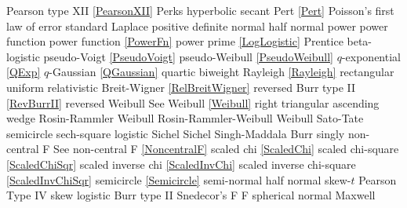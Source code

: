 Pearson type XII 				\dotfill	\eqref{PearsonXII}					\ncite	%
Perks						\dotfill	hyperbolic secant 					\ncite	%
Pert							\dotfill	\eqref{Pert} 						\ncite	%
Poisson's first law of error			\dotfill	standard Laplace					\ncite	%
positive definite normal 			\dotfill	half normal 						\ncite 	%
power						\dotfill	power function 						\ncite	%
power function					\dotfill	\eqref{PowerFn}					\ncite	%
power prime					\dotfill	\eqref{LogLogistic}					\mcite{\self}
Prentice 						\dotfill	beta-logistic							
pseudo-Voigt					\dotfill	\eqref{PseudoVoigt}					\ncite
pseudo-Weibull					\dotfill	\eqref{PseudoWeibull}				\ncite	%
%
$q$-exponential				\dotfill	\eqref{QExp}						\ncite	%
$q$-Gaussian					\dotfill	\eqref{QGaussian}					\ncite	%
quartic						\dotfill	biweight							\ncite
%
Rayleigh  						\dotfill	\eqref{Rayleigh}					\ncite	%
rectangular					\dotfill	uniform 							\ncite	%
relativistic Breit-Wigner			\dotfill	\eqref{RelBreitWigner}				\ncite	%
reversed Burr type II				\dotfill	\eqref{RevBurrII} 					\ncite	%
reversed Weibull				\dotfill	See Weibull \eqref{Weibull}			\ncite	%
right triangular					\dotfill	ascending wedge 					\ncite	%
Rosin-Rammler 				\dotfill	Weibull							   		%
Rosin-Rammler-Weibull 			\dotfill	Weibull							\ncite	%
%
Sato-Tate						\dotfill	semicircle 						\ncite	%
sech-square 					\dotfill	logistic							\ncite	%
Sichel						\dotfill	Sichel							\ncite	
Singh-Maddala 					\dotfill	Burr 								\ncite	%
singly non-central F       			 \dotfill	See non-central F  \eqref{NoncentralF}	\ncite 
scaled chi						\dotfill	\eqref{ScaledChi}					\ncite	%
scaled chi-square 				\dotfill	\eqref{ScaledChiSqr}					\ncite	%
scaled inverse chi 				\dotfill	\eqref{ScaledInvChi}					\ncite	%
scaled inverse chi-square 			\dotfill	\eqref{ScaledInvChiSqr}				 	%
semicircle						\dotfill	\eqref{Semicircle}					\ncite	%
semi-normal 					\dotfill	half normal 						\ncite	%
skew-$t$						\dotfill	Pearson Type IV 					\ncite	%
skew logistic					\dotfill	Burr type II 						\ncite	%
Snedecor's F  					\dotfill	F 								\ncite	%
spherical normal				\dotfill	Maxwell							\ncite	%

